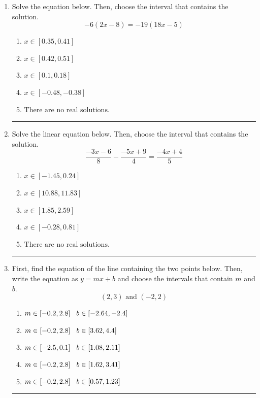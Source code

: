 \documentclass[14pt]{extbook}
\newcommand{\litem}[1]{\item#1\hspace*{-1cm}\rule{\textwidth}{0.4pt}}
\begin{document}
\begin{enumerate}
{\begin{enumerate}[label=\Alph*.]
\end{enumerate} }
\litem{
Solve the equation below. Then, choose the interval that contains the solution.\[ -6(2x -8) = -19(18x -5) \]\begin{enumerate}[label=\Alph*.]
\item \( x \in [0.35, 0.41] \)
\item \( x \in [0.42, 0.51] \)
\item \( x \in [0.1, 0.18] \)
\item \( x \in [-0.48, -0.38] \)
\item \( \text{There are no real solutions.} \)

\end{enumerate} }
\litem{
Solve the linear equation below. Then, choose the interval that contains the solution.\[ \frac{-3x -6}{8} - \frac{-5x + 9}{4} = \frac{-4x + 4}{5} \]\begin{enumerate}[label=\Alph*.]
\item \( x \in [-1.45, 0.24] \)
\item \( x \in [10.88, 11.83] \)
\item \( x \in [1.85, 2.59] \)
\item \( x \in [-0.28, 0.81] \)
\item \( \text{There are no real solutions.} \)

\end{enumerate} }
\litem{
First, find the equation of the line containing the two points below. Then, write the equation as $ y=mx+b $ and choose the intervals that contain $m$ and $b$.\[ (2, 3) \text{ and } (-2, 2) \]\begin{enumerate}[label=\Alph*.]
\item \( m \in [-0.2, 2.8] \hspace*{3mm} b \in [-2.64, -2.4] \)
\item \( m \in [-0.2, 2.8] \hspace*{3mm} b \in [3.62, 4.4] \)
\item \( m \in [-2.5, 0.1] \hspace*{3mm} b \in [1.08, 2.11] \)
\item \( m \in [-0.2, 2.8] \hspace*{3mm} b \in [1.62, 3.41] \)
\item \( m \in [-0.2, 2.8] \hspace*{3mm} b \in [0.57, 1.23] \)


\end{enumerate}}
\end{enumerate}
\end{document}
